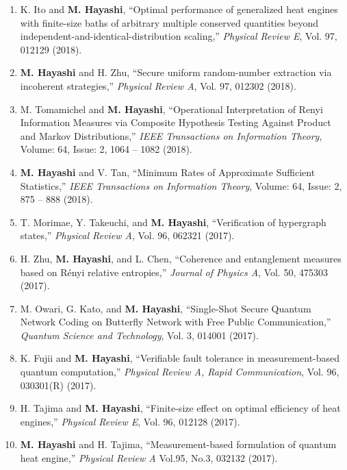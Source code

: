 \documentclass[a4paper,12pt,oneside]{article}
\begin{document}
\begin{enumerate}
\item 
K. Ito and \textbf{M. Hayashi},
``Optimal performance of generalized heat engines with finite-size baths
of arbitrary multiple conserved quantities beyond independent-and-identical-distribution scaling,''
{\em Physical Review E}, Vol. 97, 012129 (2018).

\item 
\textbf{M. Hayashi} and H. Zhu,
``Secure uniform random-number extraction via incoherent strategies,''
{\em Physical Review A}, Vol. 97, 012302 (2018).

\item 
M. Tomamichel and \textbf{M. Hayashi}, 
``Operational Interpretation of Renyi Information Measures via Composite Hypothesis Testing Against Product and Markov Distributions,''
{\em IEEE Transactions on Information Theory},
Volume: 64, Issue: 2, 1064 -- 1082 (2018). 

\item 
\textbf{M. Hayashi} and V. Tan, 
``Minimum Rates of Approximate Sufficient Statistics,''
{\em IEEE Transactions on Information Theory},
Volume: 64, Issue: 2, 875 -- 888 (2018). 

\item 
T. Morimae, Y. Takeuchi, and \textbf{M. Hayashi},
``Verification of hypergraph states,''
{\em Physical Review A}, Vol. 96, 062321 (2017).

\item 
H. Zhu, \textbf{M. Hayashi}, and L. Chen, 
``Coherence and entanglement measures based on R\'{e}nyi relative entropies,''
{\em Journal of Physics A},
Vol. 50, 475303 (2017).

\item
M. Owari, G. Kato, and \textbf{M. Hayashi},
``Single-Shot Secure Quantum Network Coding on Butterfly Network with Free Public Communication,''
{\em Quantum Science and Technology},
Vol. 3, 014001 (2017). 

\item
K. Fujii and \textbf{M. Hayashi},
``Verifiable fault tolerance in measurement-based quantum computation,''
{\em Physical Review A, Rapid Communication},
Vol. 96, 030301(R) (2017).

\item
H. Tajima and \textbf{M. Hayashi},
``Finite-size effect on optimal efficiency of heat engines,''
{\em Physical Review E}, Vol. 96, 012128 (2017).

\item
\textbf{M. Hayashi} and H. Tajima, 
``Measurement-based formulation of quantum heat engine,'' 
{\em Physical Review A} Vol.95, No.3, 032132 (2017). 


\end{enumerate}
\end{document}
